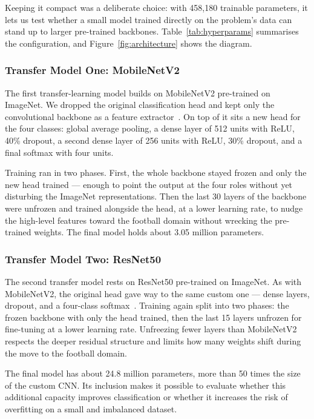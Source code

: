 \documentclass[preprint,12pt]{elsarticle}
\begin{document}
Keeping it compact was a deliberate choice: with 458,180 trainable parameters, it lets us test whether a small model trained directly on the problem's data can stand up to larger pre-trained backbones. Table~\ref{tab:hyperparams} summarises the configuration, and Figure~\ref{fig:architecture} shows the diagram.

\subsubsection{Transfer Model One: MobileNetV2}

The first transfer-learning model builds on MobileNetV2 pre-trained on ImageNet. We dropped the original classification head and kept only the convolutional backbone as a feature extractor~\cite{sandler2018mobilenetv2,deng2009imagenet}. On top of it sits a new head for the four classes: global average pooling, a dense layer of 512 units with ReLU, 40\% dropout, a second dense layer of 256 units with ReLU, 30\% dropout, and a final softmax with four units.

Training ran in two phases. First, the whole backbone stayed frozen and only the new head trained --- enough to point the output at the four roles without yet disturbing the ImageNet representations. Then the last 30 layers of the backbone were unfrozen and trained alongside the head, at a lower learning rate, to nudge the high-level features toward the football domain without wrecking the pre-trained weights. The final model holds about 3.05 million parameters.

\subsubsection{Transfer Model Two: ResNet50}

The second transfer model rests on ResNet50 pre-trained on ImageNet. As with MobileNetV2, the original head gave way to the same custom one --- dense layers, dropout, and a four-class softmax~\cite{he2016deep}. Training again split into two phases: the frozen backbone with only the head trained, then the last 15 layers unfrozen for fine-tuning at a lower learning rate. Unfreezing fewer layers than MobileNetV2 respects the deeper residual structure and limits how many weights shift during the move to the football domain.

The final model has about 24.8 million parameters, more than 50 times the size of the custom CNN. Its inclusion makes it possible to evaluate whether this additional capacity improves classification or whether it increases the risk of overfitting on a small and imbalanced dataset.
\end{document}
